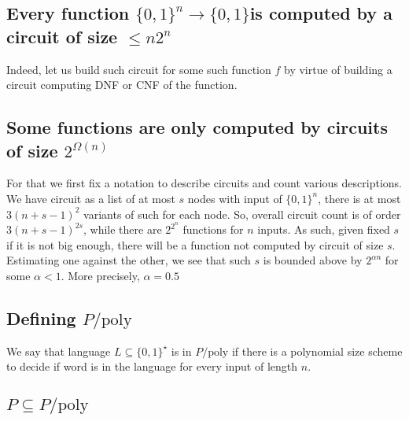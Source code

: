 \documentclass[12pt]{article}
\begin{document}
\subsection{Every function \(\{0,1\}^n\to\{0,1\}\)is computed by a circuit of size \(\leq n 2^n\)}

Indeed, let us build such circuit for some such function \(f\) by virtue of building a circuit computing DNF or CNF of the function.

\subsection{Some functions are only computed by circuits of size \(2^{\Omega(n)}\)}
For that we first fix a notation to describe circuits and count various descriptions. We have circuit as a list of at most \(s\) nodes with input of \(\{0,1\}^n\), there is at most \(3(n+s-1)^2\) variants of such for each node.
So, overall circuit count is of order \(3(n+s-1)^{2s}\), while there are \(2^{2^n}\) functions for \(n\) inputs. As such, given fixed \(s\) if it is not big enough, there will be a function not computed by circuit of size \(s\).
Estimating one against the other, we see that such \(s\) is bounded above by \(2^{\alpha n} \) for some \(\alpha < 1\). More precisely, \(\alpha = 0.5\)

\subsection{Defining \(P/\text{poly}\)}
We say that language \(L\subseteq \{0,1\}^\star\) is in \(P/\text{poly}\) if there is a polynomial size scheme to decide if word is in the language for every input of length \(n\).

\subsection{\(P\subseteq P/\text{poly}\)}
\end{document}

